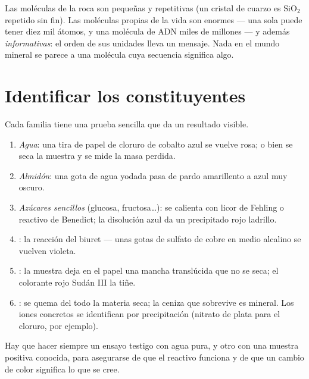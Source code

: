 \begin{remark}\label{rem:g10:chemistry-of-life:macromolecules}
Las moléculas de la roca son pequeñas y repetitivas (un cristal de
cuarzo es $\mathrm{SiO_2}$ repetido sin fin). Las moléculas propias de
la vida son enormes --- una sola  puede tener diez mil átomos,
y una molécula de ADN miles de millones --- y además
\emph{informativas}: el orden de sus unidades lleva un mensaje. Nada en
el mundo mineral se parece a una molécula cuya secuencia significa
algo.
\end{remark}

\section{Identificar los constituyentes}

\begin{method}\label{met:g10:chemistry-of-life:tests}
Cada familia tiene una prueba sencilla que da un resultado visible.
\begin{enumerate}
  \item \emph{Agua}: una tira de papel de cloruro de cobalto azul se
        vuelve rosa; o bien se seca la muestra y se mide la masa
        perdida.
  \item \emph{Almidón}: una gota de agua yodada pasa de pardo
        amarillento a azul muy oscuro.
  \item \emph{Azúcares sencillos} (glucosa, fructosa\dots): se calienta
        con licor de Fehling o reactivo de Benedict; la disolución azul
        da un precipitado rojo ladrillo.
  \item \emph{}: la reacción del biuret --- unas gotas de
        sulfato de cobre en medio alcalino se vuelven violeta.
  \item \emph{}: la muestra deja en el papel una mancha
        translúcida que no se seca; el colorante rojo Sudán III la
        tiñe.
  \item \emph{}: se quema del todo la materia seca; la
        ceniza que sobrevive es mineral. Los iones concretos se
        identifican por precipitación (nitrato de plata para el
        cloruro, por ejemplo).
\end{enumerate}
Hay que hacer siempre un ensayo testigo con agua pura, y otro con una
muestra positiva conocida, para asegurarse de que el reactivo funciona
y de que un cambio de color significa lo que se cree.
\end{method}

